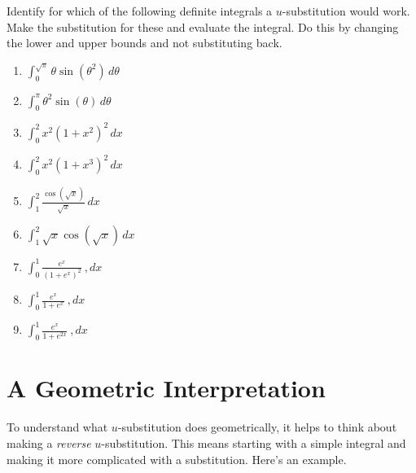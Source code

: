 \documentclass{ximera}
\begin{document}
\begin{question}\label{Q7yyweff}
Identify for which of the following definite integrals a $u$-substitution would work. Make the substitution for these and evaluate the integral. Do this by changing the lower and upper bounds and not substituting back.

\begin{enumerate}

\item $\int_0^{\sqrt{\pi}} \theta \sin(\theta^2)\, d\theta$

\item $\int_0^{\pi} \theta^2 \sin(\theta)\, d\theta$

\item $\int_0^2 x^2 (1+x^2)^2 \, dx$

\item $\int_0^2 x^2 (1+x^3)^2 \, dx$

\item $\int_1^2 \frac{\cos \left( \sqrt{x} \right)}{\sqrt{x}}\, dx$

\item $\int_1^2 \sqrt{x} \cos \left( \sqrt{x} \right)\, dx$

\item $\int_0^1 \frac{e^x}{(1+e^x)^2} \ , dx$

\item $\int_0^1 \frac{e^x}{1+e^x} \ , dx$

\item $\int_0^1 \frac{e^x}{1+e^{2x}} \ , dx$


\end{enumerate}

\end{question}


\section{A Geometric Interpretation}
To understand what $u$-substitution does geometrically, it helps to think about making a \emph{reverse} $u$-substitution. This means starting with a simple integral and making it more complicated with a substitution. Here's an example.
\end{document}
